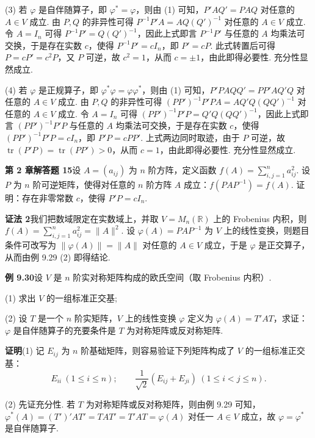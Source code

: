 \documentclass[UTF8, 12pt, fontset=fandol, oneside]{ctexart}
\begin{document}
(3) 若 $\varphi$ 是自伴随算子，即 $\varphi^*=\varphi$，则由 (1) 可知，$P'AQ'=PAQ$ 对任意的 $A\in V$ 成立. 由 $P,Q$ 的非异性可得 $P^{-1}P'A=AQ(Q')^{-1}$ 对任意的 $A\in V$ 成立. 令 $A=I_n$ 可得 $P^{-1}P'=Q(Q')^{-1}$，因此上式即言 $P^{-1}P'$ 与任意的 $A$ 均乘法可交换，于是存在实数 $c$，使得 $P^{-1}P'=cI_n$，即 $P'=cP$. 此式转置后可得 $P=cP'=c^2P$，又 $P$ 可逆，故 $c^2=1$，从而 $c=\pm1$，由此即得必要性. 充分性显然成立.

(4) 若 $\varphi$ 是正规算子，即 $\varphi^*\varphi=\varphi\varphi^*$，则由 (1) 可知，$P'PAQQ'=PP'AQ'Q$ 对任意的 $A\in V$ 成立. 由 $P,Q$ 的非异性可得 $(PP')^{-1}P'PA=AQ'Q(QQ')^{-1}$ 对任意的 $A\in V$ 成立. 令 $A=I_n$ 可得 $(PP')^{-1}P'P=Q'Q(QQ')^{-1}$，因此上式即言 $(PP')^{-1}P'P$ 与任意的 $A$ 均乘法可交换，于是存在实数 $c$，使得 $(PP')^{-1}P'P=cI_n$，即 $P'P=cPP'$. 上式两边同时取迹，由于 $P$ 可逆，故 $\operatorname{tr}(P'P)=\operatorname{tr}(PP')>0$，从而 $c=1$，由此即得必要性. 充分性显然成立.

\noindent\textbf{第 2 章解答题 15}\quad 设 $A=(a_{ij})$ 为 $n$ 阶方阵，定义函数 $f(A)=\sum_{i,j=1}^n a_{ij}^2$. 设 $P$ 为 $n$ 阶可逆矩阵，使得对任意的 $n$ 阶方阵 $A$ 成立：$f(PAP^{-1})=f(A)$. 证明：存在非零常数 $c$，使得 $P'P=cI_n$.

\noindent\textbf{证法 2}\quad 我们把数域限定在实数域上，并取 $V=M_n(\mathbb{R})$ 上的 Frobenius 内积，则 $f(A)=\sum_{i,j=1}^n a_{ij}^2=\|A\|^2$. 设 $\varphi(A)=PAP^{-1}$ 为 $V$ 上的线性变换，则题目条件可改写为 $\|\varphi(A)\|=\|A\|$ 对任意的 $A\in V$ 成立，于是 $\varphi$ 是正交算子，从而由例 9.29 (2) 即得结论.

\noindent\textbf{例 9.30}\quad 设 $V$ 是 $n$ 阶实对称矩阵构成的欧氏空间（取 Frobenius 内积）.

(1) 求出 $V$ 的一组标准正交基;

(2) 设 $T$ 是一个 $n$ 阶实矩阵，$V$ 上的线性变换 $\varphi$ 定义为 $\varphi(A)=T'AT$，求证：$\varphi$ 是自伴随算子的充要条件是 $T$ 为对称矩阵或反对称矩阵.

\noindent\textbf{证明}\quad (1) 记 $E_{ij}$ 为 $n$ 阶基础矩阵，则容易验证下列矩阵构成了 $V$ 的一组标准正交基：
\[
E_{ii}\ (1\le i\le n);\qquad \frac1{\sqrt2}(E_{ij}+E_{ji})\ (1\le i<j\le n).
\]

(2) 先证充分性. 若 $T$ 为对称矩阵或反对称矩阵，则由例 9.29 可知，$\varphi^*(A)=(T')'AT'=TAT'=T'AT=\varphi(A)$ 对任一 $A\in V$ 成立，故 $\varphi=\varphi^*$ 是自伴随算子.
\end{document}
